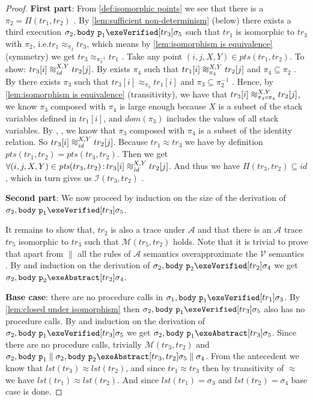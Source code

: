 \documentclass[runningheads,a4paper]{llncs}
\makeatletter
\newcommand*{\ie}{i.e.\@\xspace}
\DeclareMathOperator{\suchthat}{:}
\newcommand*{\domain}[1]{\mathit{dom}(#1)}
\newcommand*{\identity}[0]{\mathit{id}}
\newcommand*{\last}[1]{\mathit{lst}(#1)}
\newcommand{\tr}{tr}
\newcommand*\iso{\approx}
\newcommand*{\parcomp}{\parallel}
\newcommand*\Asemantics{\mathcal{A}}
\newcommand*\asemantics{$\Asemantics$ semantics}
\newcommand*\Vsemantics{\mathcal{V}}
\newcommand*\vsemantics{$\Vsemantics$ semantics}
\newcommand*{\body}{\mathtt{body}}
\newcommand*{\fun}{\texttt{p}}
\newcommand*{\wiso}{%
  \mathrel{\vcenter{\offinterlineskip
  \hbox{$\sim$}\vskip-.35ex\hbox{$\sim$}\vskip-.35ex\hbox{$\sim$}}}}
\newcommand*{\myIsoCompatibleStates}{\mathit{pts}}
\newcommand*{\isoR}{\mathcal{I}}
\newcommand*{\mutR}{\mathcal{M}}
\newcommand*{\store}{\sigma}
\makeatother
\begin{document}
\begin{proof}
\textbf{First part}: From \cref{def:isomorphic points} we see that there is a $\pi_2=\Pi(\tr_1,\tr_2)$ \tagone{}.
%
By \cref{lem:sufficient non-determinism} (below) there exists a third execution $\store_2,\body~\fun_1\exeVerified[\tr_3]\store_5$ such that $\tr_1$ is isomorphic to $\tr_3$ with $\pi_2$, \ie $\tr_1\iso_{\pi_2}\tr_3$, which means by \cref{lem:isomorphism is equivalence} (symmetry) we get $\tr_3\iso_{\pi^{-1}_2}\tr_1$ \tagtwo{}.
%
Take any point $(i,j,X,Y) \in \myIsoCompatibleStates(tr_1, tr_2)$. To show: $\tr_3[i] \wiso_{\identity}^{X,Y} \tr_2[j]$.
%
By \tagone{} exists $\pi_4$ such that $\tr_1[i] \wiso_{\pi_4}^{X,Y} \tr_2[j]$ and $\pi_4 \subseteq \pi_2$ \tagfour{}.
%
By \tagtwo{} there exists $\pi_3$ such that $\tr_3[i] \iso_{\pi_3} \tr_1[i]$ and $\pi_3 \subseteq \pi_2^{-1}$ \tagthree{}.
%
Hence, by \cref{lem:isomorphism is equivalence} (transitivity), we have that $\tr_3[i] \wiso_{\pi_3 \circ \pi_4}^{X,Y} \tr_2[j]$, we know $\pi_3$ composed with $\pi_4$ is large enough because $X$ is a subset of the stack variables defined in $\tr_1[i]$, and $\domain{\pi_3}$ includes the values of all stack variables.
%
By \tagthree{}, \tagfour{}, we know that $\pi_3$ composed with $\pi_4$ is a subset of the identity relation. So $\tr_3[i] \wiso_{\identity}^{X,Y} \tr_2[j]$.
%
Because $\tr_1\iso\tr_3$ we have by definition $\myIsoCompatibleStates(tr_1, tr_2)=\myIsoCompatibleStates(tr_3, tr_2)$. Then we get $\forall (i,j,X,Y) \in \myIsoCompatibleStates(tr_3, tr_2) \suchthat \tr_3[i] \wiso_{\identity}^{X,Y} \tr_2[j]$. And thus we have $\Pi(\tr_3,\tr_2) \subseteq \identity$, which in turn gives us $\isoR(\tr_3,\tr_2)$ \tagfive{}.

\noindent\textbf{Second part}: We now proceed by induction on the size of the derivation of $\store_2,\body~\fun_1 \exeVerified[\tr_3] \store_5$.

It remains to show that, $\tr_2$ is also a trace under $\Asemantics$ and that there is an $\Asemantics$ trace $\tr_5$ isomorphic to $\tr_3$ such that $\mutR(\tr_5,\tr_2)$ holds.
%
Note that it is trivial to prove that apart from $\parcomp$ all the rules of \asemantics{} overapproximate the \vsemantics{} \sublemmaone{}.
%
By \sublemmaone{} and induction on the derivation of $\store_2,\body~\fun_2\exeVerified[\tr_2]\store_4$ we get $\store_2,\body~\fun_2\exeAbstract[\tr_2]\store_4$.

\noindent\textbf{Base case}: there are no procedure calls in $\store_1,\body~\fun_1\exeVerified[\tr_1]\store_3$.
%
By \cref{lem:closed under isomorphism} then $\store_2,\body~\fun_1\exeVerified[\tr_3]\store_5$ also has no procedure calls.
%
By \sublemmaone{} and induction on the derivation of $\store_2,\body~\fun_1\exeVerified[\tr_3]\store_5$ we get $\store_2,\body~\fun_1\exeAbstract[\tr_3]\store_5$.
%
Since there are no procedure calls, trivially $\mutR(\tr_3,\tr_2)$  and $\store_2,\body~\fun_1 \parcomp \store_2,\body~\fun_2 \exeAbstract[\tr_3,\tr_2] \store_5 \parcomp \store_4$.
%
From the antecedent we know that $\last{\tr_3}\iso\last{\tr_2}$, and since $\tr_1\iso\tr_3$ then by transitivity of $\iso$ we have $\last{\tr_1}\iso\last{\tr_2}$. And since $\last{\tr_1}=\store_3$ and $\last{\tr_2}=\store_4$ base case is done.


\end{proof}
\end{document}
